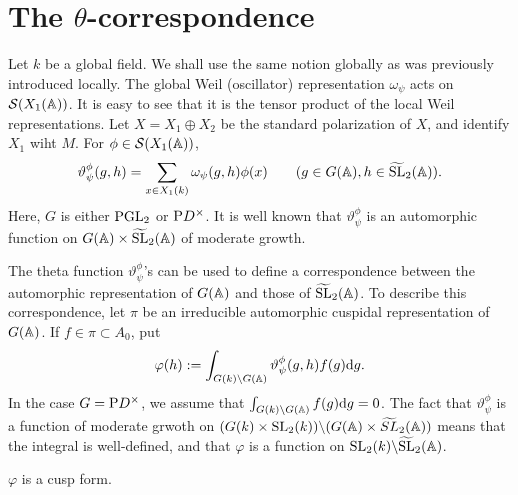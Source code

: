 \section{The $\theta$-correspondence}
\label{sec:3}

Let $k$ be a global field.
We shall use the same notion globally as was previously introduced locally.
The global Weil (oscillator) representation $\omega_\psi$ acts on $\mathcal{S}(X_1(\mathbb{A}))$.
It is easy to see that it is the tensor product of the local Weil representations.
Let $X = X_1 \oplus X_2$ be the standard polarization of $X$, and identify $X_1$ wiht $M$.
For $\phi \in \mathcal{S}(X_1(\mathbb{A}))$,
\[
\vartheta_\psi^\phi(g, h) = \sum_{x \in X_1(k)} \omega_\psi(g, h) \phi(x)\qquad (g \in G(\mathbb{A}), h \in \widetilde{\mathrm{SL}}_2(\mathbb{A})).
\]
Here, $G$ is either $\mathrm{PGL}_2$ or $\mathrm{P} D^\times$.
It is well known that $\vartheta_\psi^\phi$ is an automorphic function on $G(\mathbb{A}) \times \widetilde{\mathrm{SL}}_2(\mathbb{A})$ of moderate growth.

The theta function $\vartheta_\psi^\phi$'s can be used to define a correspondence between the automorphic representation of $G(\mathbb{A})$ and those of $\widetilde{\mathrm{SL}}_2(\mathbb{A})$.
To describe this correspondence, let $\pi$ be an irreducible automorphic cuspidal representation of $G(\mathbb{A})$.
If $f \in \pi \subset A_0$, put
\[
\varphi(h) := \int_{G(k) \backslash G(\mathbb{A})} \vartheta_\psi^\phi(g, h) f(g) \mathrm{d} g.
\]
In the case $G = \mathrm{P} D^\times$, we assume that $\int_{G(k)\backslash G(\mathbb{A})} f(g) \mathrm{d} g = 0$.
The fact that $\vartheta_\psi^\phi$ is a function of moderate grwoth on $(G(k) \times \mathrm{SL}_2(k)) \backslash (G(\mathbb{A}) \times \widetilde{SL}_2(\mathbb{A}))$ means that the integral is well-defined, and that $\varphi$ is a function on $\mathrm{SL}_2(k) \backslash \widetilde{\mathrm{SL}}_2(\mathbb{A})$.

\begin{claim}
$\varphi$ is a cusp form.
\end{claim}


